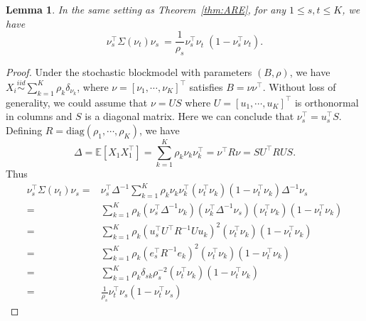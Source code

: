 \documentclass[10pt,letterpaper]{article}
\newtheorem{lemma}[fact]{Lemma}
\renewcommand{\Re}{\mathbb{R}}
\newcommand{\Ex}{\mathbb{E}}
\begin{document}
\begin{lemma}
\label{lm:mseForm}
In the same setting as Theorem~\ref{thm:ARE}, for any $1 \le s, t \le K$, we have
\[
	\nu_s^{\top} \Sigma(\nu_t) \nu_s^{\phantom{\top}} = \frac{1}{\rho_s} \nu_s^{\top} \nu_t^{\phantom{\top}} (1- \nu_s^{\top} \nu_t).
\]
\end{lemma}
\begin{proof}
Under the stochastic blockmodel with parameters $(B, \rho)$, we have $X_i \stackrel{iid}{\sim} \sum_{k=1}^K \rho_k \delta_{\nu_k}$, where $\nu = [\nu_1, \cdots, \nu_K]^{\top}$ satisfies $B = \nu \nu^{\top}$. Without loss of generality, we could assume that $\nu = U S$ where $U = [u_1, \cdots, u_K]^{\top}$ is orthonormal in columns and $S$ is a diagonal matrix. Here we can conclude that $\nu_s^{\top} = u_s^{\top} S$. Defining $R = \text{diag}(\rho_1, \cdots, \rho_K)$, we have
\[
	\Delta = \Ex[X_1 X_1^{\top}] = \sum_{k=1}^K \rho_k \nu_k \nu_k^{\top} = \nu^{\top} R \nu = S U^{\top} R U S.
\]
Thus
\begin{align*}
	\nu_s^{\top} \Sigma(\nu_t) \nu_s = &
    \nu_s^{\top} \Delta^{-1} \sum_{k=1}^K \rho_k \nu_k \nu_k^{\top} (\nu_t^{\top} \nu_k)(1 - \nu_t^{\top} \nu_k) \Delta^{-1} \nu_s \\
    = & \sum_{k=1}^K \rho_k (\nu_s^{\top} \Delta^{-1} \nu_k) (\nu_k^{\top} \Delta^{-1} \nu_s) (\nu_t^{\top} \nu_k) (1 - \nu_t^{\top} \nu_k) \\
    = & \sum_{k=1}^K \rho_k (u_s^{\top} U^{\top} R^{-1} U u_k)^2 (\nu_t^{\top} \nu_k) (1 - \nu_t^{\top} \nu_k) \\
    = & \sum_{k=1}^K \rho_k (e_s^{\top} R^{-1} e_k)^2 (\nu_t^{\top} \nu_k) (1 - \nu_t^{\top} \nu_k) \\
    = & \sum_{k=1}^K \rho_k \delta_{sk} \rho_s^{-2} (\nu_t^{\top} \nu_k) (1 - \nu_t^{\top} \nu_k) \\
    = & \frac{1}{\rho_s} \nu_t^{\top} \nu_s (1 - \nu_t^{\top} \nu_s)
\end{align*}
\end{proof}

\end{document}
